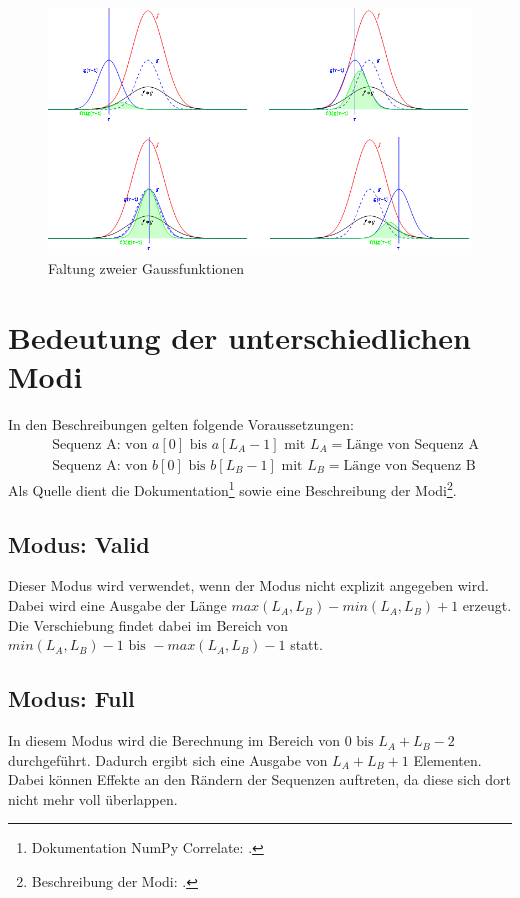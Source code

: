 \begin{figure}[H]
  \centering
  \includegraphics[width=0.8\linewidth]{./images/convolution2.png}
  \caption[Beispiel 2 für die Faltung]{Faltung zweier Gaussfunktionen\footnotemark}
  \label{fig:convolutionExample2}
\end{figure}

\section{Bedeutung der unterschiedlichen Modi}
\begin{samepage}
  In den Beschreibungen gelten folgende Voraussetzungen: 
  \begin{align*}
    & \text{Sequenz A: von }a[0] \text{ bis }a[L_A - 1] \text{ mit } L_A = \text{Länge von Sequenz A}\\
    & \text{Sequenz A: von }b[0] \text{ bis }b[L_B - 1] \text{ mit } L_B = \text{Länge von Sequenz B}
  \end{align*}
  Als Quelle dient die Dokumentation\footnote{Dokumentation NumPy Correlate: \cite{DocumentationNumpyCorrelate}.} sowie eine Beschreibung der 
  Modi\footnote{Beschreibung der Modi: \cite{NumPyCorrelationModesExplained}.}.
\end{samepage}


\subsection{Modus: Valid}\label{sec:numpy_correlate_mode}
Dieser Modus wird verwendet, wenn der Modus nicht explizit angegeben wird.\\
Dabei wird eine Ausgabe der Länge $ max(L_A, L_B) - min(L_A, L_B) + 1 $ erzeugt. Die Verschiebung findet dabei im Bereich 
von $ min(L_A, L_B) - 1 \text{ bis } - max(L_A, L_B) - 1 $ statt.

\subsection{Modus: Full}
In diesem Modus wird die Berechnung im Bereich von $ 0 \text{ bis }  L_A + L_B - 2 $ durchgeführt. 
Dadurch ergibt sich eine Ausgabe von $ L_A + L_B + 1 $ Elementen. Dabei können Effekte an den Rändern der Sequenzen auftreten, da diese
sich dort nicht mehr voll überlappen.

